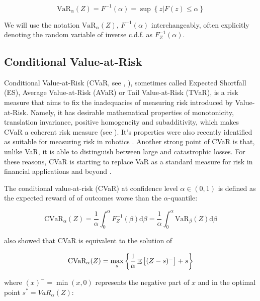 \begin{equation}
\text{VaR}_\alpha(Z)=F^{-1}(\alpha)=\sup\left\lbrace z | F(z) \le \alpha \right\rbrace
\end{equation}

We will use the notation $\text{VaR}_\alpha(Z)$, $F^{-1}(\alpha)$ interchangeably, often explicitly denoting the random variable of inverse c.d.f. as $F^{-1}_Z(\alpha)$.

\subsection{Conditional Value-at-Risk}

Conditional Value-at-Risk (CVaR, see \citet{rockafellar2000optimization}, \citep{rockafellar2002conditional}), sometimes called Expected Shortfall (ES), Average Value-at-Risk (AVaR) or Tail Value-at-Risk (TVaR), is a risk measure that aims to fix the inadequacies of measuring risk introduced by Value-at-Risk. Namely, it has desirable mathematical properties of monotonicity, translation invariance, positive homogeneity and subadditivity, which makes CVaR a coherent risk measure (see \citet{artzner1999coherent}). It's properties were also recently identified as suitable for measuring risk in robotics \cite{majumdar2017should}. Another strong point of CVaR is that, unlike VaR, it is able to distinguish between large and catastrophic losses. For these reasons, CVaR is starting to replace VaR as a standard measure for risk in financial applications \citep{basel2013fundamental} and beyond \cite{something}.

The conditional value-at-risk (CVaR) at confidence level $\alpha \in (0,1)$ is defined as the expected reward of of outcomes worse than the $\alpha$-quantile:

\begin{equation}\label{eqn:prelim:cvar}
\text{CVaR}_\alpha(Z) = \dfrac{1}{\alpha}\int_0^\alpha F^{-1}_Z(\beta) \text{d}\beta = \dfrac{1}{\alpha}\int_0^\alpha \text{VaR}_\beta(Z) \text{d}\beta
\end{equation}

\citet{rockafellar2000optimization} also showed that CVaR is equivalent to the solution of

\begin{equation}\label{eqn:prelim:cvar2}
\text{CVaR}_\alpha(Z)=
\max_s\left\lbrace \dfrac{1}{\alpha}\mathop{\mathbb{E}}
\left[ (Z-s)^-\right] + s  \right\rbrace 
\end{equation}

where $(x)^- = \min(x, 0)$ represents the negative part of $x$ and in the optimal point $s^* = VaR_\alpha(Z)$:

